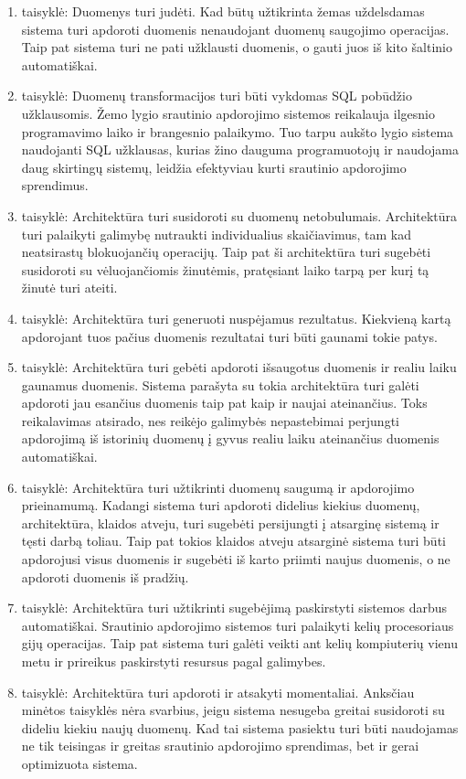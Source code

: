 \documentclass{VUMIFPSkursinis}
\begin{document}
\begin{enumerate}[label=\arabic*]
    \item taisyklė: Duomenys turi judėti. Kad būtų užtikrinta žemas uždelsdamas sistema turi apdoroti duomenis nenaudojant duomenų saugojimo operacijas. Taip pat sistema turi ne pati užklausti duomenis, o gauti juos
    iš kito šaltinio automatiškai. 
    \item taisyklė: Duomenų transformacijos turi būti vykdomas SQL pobūdžio užklausomis. Žemo lygio srautinio apdorojimo sistemos reikalauja ilgesnio programavimo laiko ir brangesnio palaikymo. Tuo tarpu aukšto lygio sistema 
    naudojanti SQL užklausas, kurias žino dauguma programuotojų ir naudojama daug skirtingų sistemų, leidžia efektyviau kurti srautinio apdorojimo sprendimus.
    \item taisyklė: Architektūra turi susidoroti su duomenų netobulumais. Architektūra turi palaikyti galimybę nutraukti individualius skaičiavimus, tam kad neatsirastų blokuojančių operacijų. Taip pat ši 
    architektūra turi sugebėti susidoroti su vėluojančiomis žinutėmis, pratęsiant laiko tarpą per kurį tą žinutė turi ateiti.
    \item taisyklė: Architektūra turi generuoti nuspėjamus rezultatus. Kiekvieną kartą apdorojant tuos pačius duomenis rezultatai turi būti gaunami tokie patys.
    \item taisyklė: Architektūra turi gebėti apdoroti išsaugotus duomenis ir realiu laiku gaunamus duomenis. Sistema parašyta su tokia architektūra turi galėti apdoroti jau esančius duomenis taip pat kaip ir 
    naujai ateinančius. Toks reikalavimas atsirado, nes reikėjo galimybės nepastebimai perjungti apdorojimą iš istorinių duomenų į gyvus realiu laiku ateinančius duomenis automatiškai.
    \item taisyklė: Architektūra turi užtikrinti duomenų saugumą ir apdorojimo prieinamumą. Kadangi sistema turi apdoroti didelius kiekius duomenų, architektūra, klaidos atveju, turi sugebėti persijungti į atsarginę
    sistemą ir tęsti darbą toliau. Taip pat tokios klaidos atveju atsarginė sistema turi būti apdorojusi visus duomenis ir sugebėti iš karto priimti naujus duomenis, o ne apdoroti duomenis iš pradžių.
    \item taisyklė: Architektūra turi užtikrinti sugebėjimą paskirstyti sistemos darbus automatiškai. Srautinio apdorojimo sistemos turi palaikyti kelių procesoriaus gijų operacijas. Taip pat sistema turi galėti 
    veikti ant kelių kompiuterių vienu metu ir prireikus paskirstyti resursus pagal galimybes.
    \item taisyklė: Architektūra turi apdoroti ir atsakyti momentaliai. Anksčiau minėtos taisyklės nėra svarbius, jeigu sistema nesugeba greitai susidoroti su dideliu kiekiu naujų duomenų. Kad tai sistema
    pasiektu turi būti naudojamas ne tik teisingas ir greitas srautinio apdorojimo sprendimas, bet ir gerai optimizuota sistema.
\end{enumerate}\par
\end{document}
